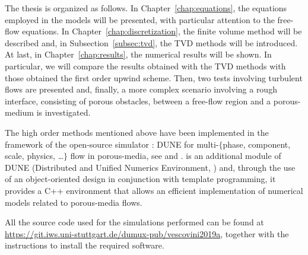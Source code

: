 The thesis is organized as follows. In Chapter~\ref{chap:equations}, the equations employed in the models will be 
presented, with particular attention to the free-flow equations. In 
Chapter~\ref{chap:discretization}, the finite volume method will be described 
and, in Subsection~\ref{subsec:tvd}, the TVD methods will be introduced. At last, 
in Chapter~\ref{chap:results}, the numerical results will be shown. In 
particular, we will
compare the results obtained with the TVD methods with those obtained
the first order upwind scheme. Then, two tests 
involving turbulent flows are presented and, finally, a more complex scenario involving 
a rough interface, consisting of porous obstacles, between a free-flow region and a porous-medium is investigated.

The high order methods mentioned above have been implemented in the framework 
of the open-source simulator \DUMUX: DUNE for multi-$\{$phase, component, 
scale, physics, \dots$\}$ flow in porous-media, see \cite{dumux:tutti} and 
\cite{dumux:flemisch}. \DUMUX is an 
additional module of DUNE (Distributed and Unified Numerics Environment, 
\cite{web:dune}) and, through the use of an object-oriented design in 
conjunction with template programming, it provides a C++ environment that 
allows an efficient implementation of numerical models related to porous-media 
flows.

All the source code used for the simulations performed can be 
found at \url{https://git.iws.uni-stuttgart.de/dumux-pub/vescovini2019a}, 
together with the instructions to install the required software.